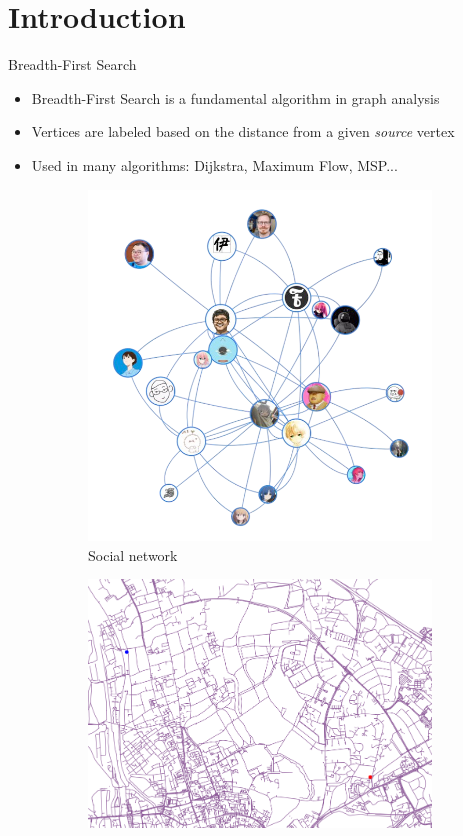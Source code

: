 \section{Introduction}

\begin{frame}{Breadth-First Search}
    \begin{itemize}
        \item Breadth-First Search is a fundamental algorithm in graph analysis
        \pause
        \item Vertices are labeled based on the \alert{distance} from a given \textit{source} vertex
        \pause
        \item Used in many algorithms: Dijkstra, Maximum Flow, MSP...
        \pause
    \end{itemize}
    \begin{figure}
        \begin{subfigure}[b]{0.32\textwidth}
            \centering
            \includegraphics[width=0.8\linewidth]{images/Collaboration network.png}
            \caption{Social network}
        \end{subfigure}
        \pause
        \hfill
        \begin{subfigure}[b]{0.32\textwidth}
            \centering
            \includegraphics[width=1.05\linewidth]{images/roadnet.png}

\end{subfigure}
\end{figure}
\end{frame}
